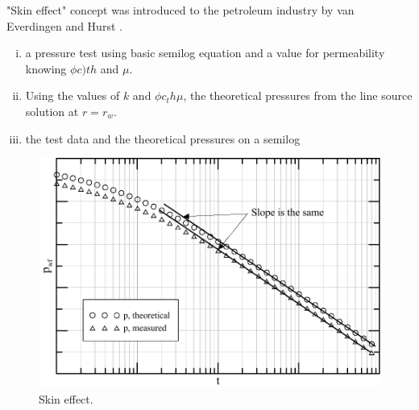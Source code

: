 \documentclass{llncs}
\numberwithin{equation}{section}
\numberwithin{figure}{section}
\numberwithin{table}{section}
\begin{document}
    "Skin effect" concept was introduced to the petroleum industry by van Everdingen \cite{Everdingen_1953_1} and Hurst \cite{Hurst_1953_1}.  
    
    \begin{enumerate}[(i)]
        \item   {} a pressure test using basic semilog equation and  a value for permeability knowing $\phi c){t} h$ and $\mu$. 
        \item   Using the values of $k$ and $\phi c_{t} h \mu$,  the theoretical pressures from the line source solution at $r=r_{w}$.
        \item   {} the test data and the theoretical pressures on a semilog 
    \end{enumerate}    
    
    \begin{figure}
        \begin{center}
        \includegraphics[scale=0.6]{Skin_effect.pdf}
        \end{center}
        \caption{Skin effect.}
        \label{Skin_effect}
    \end{figure}    
    
\end{document}
